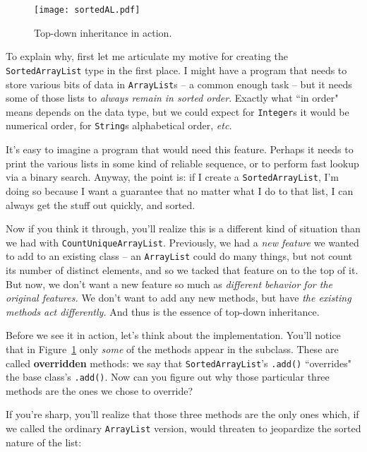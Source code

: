 \begin{figure}
\centering
\texttt{[image: sortedAL.pdf]}
\caption{Top-down inheritance in action.}
\label{fig:sortedAL}
\end{figure}

To explain why, first let me articulate my motive for creating the
\texttt{SortedArrayList} type in the first place. I might have a program that
needs to store various bits of data in \texttt{ArrayList}s -- a common enough
task -- but it needs some of those lists to \textit{always remain in sorted
order}. Exactly what ``in order" means depends on the data type, but we could
expect for \texttt{Integer}s it would be numerical order, for \texttt{String}s
alphabetical order, \textit{etc.}

It's easy to imagine a program that would need this feature. Perhaps it needs
to print the various lists in some kind of reliable sequence, or to perform
fast lookup via a binary search. Anyway, the point is: if I create a
\texttt{SortedArrayList}, I'm doing so because I want a guarantee that no
matter what I do to that list, I can always get the stuff out quickly, and
sorted.

Now if you think it through, you'll realize this is a different kind of
situation than we had with \texttt{CountUniqueArrayList}. Previously, we had a
\textit{new feature} we wanted to add to an existing class -- an
\texttt{ArrayList} could do many things, but not count its number of distinct
elements, and so we tacked that feature on to the top of it. But now, we don't
want a new feature so much as \textit{different behavior for the original
features.} We don't want to add any new methods, but have \textit{the existing
methods act differently.} And thus is the essence of top-down inheritance.

Before we see it in action, let's think about the implementation. You'll
notice that in Figure~\ref{fig:sortedAL} only \textit{some} of the methods
appear in the subclass. These are called \textbf{overridden} methods: we say
that \texttt{SortedArrayList}'s \texttt{.add()} ``overrides" the base class's
\texttt{.add()}. Now can you figure out why those particular three methods are
the ones we chose to override?

If you're sharp, you'll realize that those three methods are the only ones
which, if we called the ordinary \texttt{ArrayList} version, would threaten to
jeopardize the sorted nature of the list:

